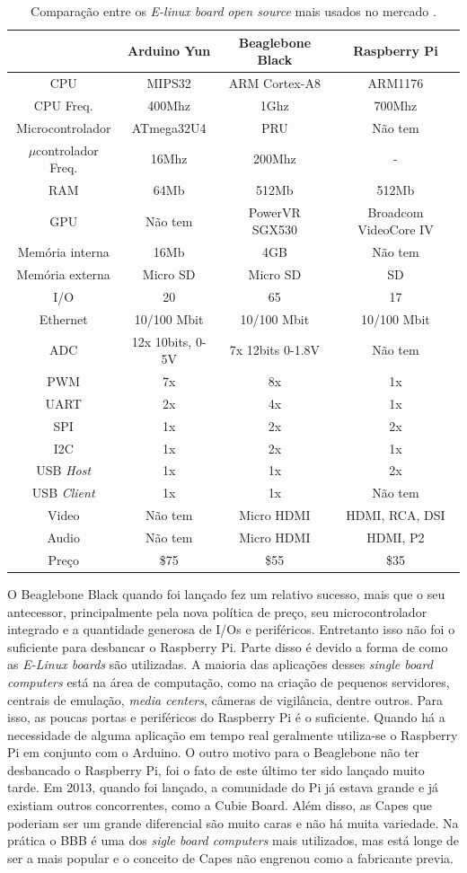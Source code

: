 \begin{table}
	\centering
	\begin{tabular}[c]{c|ccc}
		&Arduino Yun&Beaglebone Black&Raspberry Pi\\ \hline
		CPU&MIPS32&ARM Cortex-A8&ARM1176\\
		CPU Freq.&400Mhz&1Ghz&700Mhz\\ 
		Microcontrolador&ATmega32U4&PRU&Não tem\\ 
		\(\displaystyle \mu \)controlador Freq.&16Mhz&200Mhz&-\\
		RAM&64Mb&512Mb&512Mb\\ 
		GPU&Não tem&PowerVR SGX530&Broadcom VideoCore IV\\ 
		Memória interna&16Mb&4GB&Não tem\\ 
		Memória externa&Micro SD&Micro SD&SD\\ 
		I/O&20&65&17\\
		Ethernet&10/100 Mbit&10/100 Mbit&10/100 Mbit\\ 
		ADC&12x 10bits, 0-5V&7x 12bits 0-1.8V&Não tem\\ 
		PWM&7x&8x&1x\\ 
		UART&2x&4x&1x\\ 
		SPI&1x&2x&2x\\ 
		I2C&1x&2x&1x\\ 
		USB \emph{Host}&1x&1x&2x\\
		USB \emph{Client}&1x&1x&Não tem\\ 
		Video&Não tem&Micro HDMI&HDMI, RCA, DSI\\ 
		Audio&Não tem&Micro HDMI&HDMI, P2\\
		Preço&\$75&\$55&\$35\\ \hline
	\end{tabular}
	\caption{Comparação entre os \emph{E-linux board} \emph{open source} mais usados no mercado \cite{comparisonelinux}.}
	\label{tab:compsingleboardpcs}
\end{table}
	
O Beaglebone Black quando foi lançado fez um relativo sucesso, mais que o seu antecessor, principalmente pela nova política de preço, seu microcontrolador integrado e a quantidade generosa de I/Os e periféricos. Entretanto isso não foi o suficiente para desbancar o Raspberry Pi. Parte disso é devido a forma de como as \emph{E-Linux boards} são utilizadas. A maioria das aplicações desses \emph{single board computers} está na área de computação, como na criação de pequenos servidores, centrais de emulação, \emph{media centers}, câmeras de vigilância, dentre outros. Para isso, as poucas portas e periféricos do Raspberry Pi é o suficiente. Quando há a necessidade de alguma aplicação em tempo real geralmente utiliza-se o Raspberry Pi em conjunto com o Arduino. O outro motivo para o Beaglebone não ter desbancado o Raspberry Pi, foi o fato de este último ter sido lançado muito tarde. Em 2013, quando foi lançado, a comunidade do Pi já estava grande e já existiam outros concorrentes, como a Cubie Board. Além disso, as Capes que poderiam ser um grande diferencial são muito caras e não há muita variedade. Na prática o BBB é uma dos \emph{sigle board computers} mais utilizados, mas está longe de ser a mais popular e o conceito de Capes não engrenou como a fabricante previa.
	

